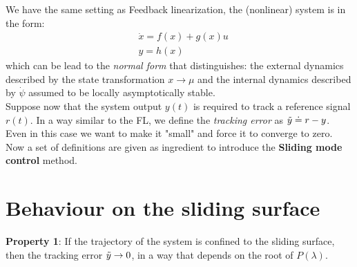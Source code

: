 \noindent
We have the same setting as Feedback linearization, the (nonlinear) system is in the form: 
\begin{equation}
    \begin{aligned}
        &\dot{x}=f(x)+g(x)u\\
        &y=h(x)
    \end{aligned}
\end{equation}
which can be lead to the \textit{normal form} that distinguishes: the external dynamics described by the state transformation $x\rightarrow \mu$ and the internal dynamics described by $\dot{\psi}$ assumed to be locally asymptotically stable.\\
Suppose now that the system output $y(t)$ is required to track a reference signal $r(t)$. In a way similar to the FL, we define the \textit{tracking error} as $\Tilde{y}\doteq  r-y$. Even in this case we want to make it "small" and force it to converge to zero.\\

Now a set of definitions are given as ingredient to introduce the \textbf{Sliding mode control} method.\\

\hspace*{-5mm}
%

\section{Behaviour on the sliding surface}
{\color{red} \textbf{Property 1}}: If the trajectory of the system is confined to the sliding surface, then the tracking error $\Tilde{y}\rightarrow 0$, in a way that depends on the root of $P(\lambda)$.\\

